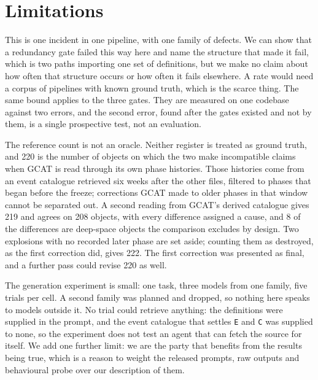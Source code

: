 \section{Limitations}
\label{sec:limits}

This is one incident in one pipeline, with one family of defects. We can show
that a redundancy gate failed this way here and name the structure that made it
fail, which is two paths importing one set of definitions, but we make no claim
about how often that structure occurs or how often it fails elsewhere. A rate
would need a corpus of pipelines with known ground truth, which is the scarce
thing. The same bound applies to the three gates. They are measured on one
codebase against two errors, and the second error, found after the gates existed and not by
them, is a single prospective test, not an evaluation.

The reference count is not an oracle. Neither register is treated as ground
truth, and 220 is the number of objects on which the two make incompatible
claims when GCAT is read through its own phase histories. Those histories come
from an event catalogue retrieved six weeks after the other files, filtered to
phases that began before the freeze; corrections GCAT made to older phases in
that window cannot be separated out. A second reading from GCAT's derived
catalogue gives 219 and agrees on 208 objects, with every difference assigned a
cause, and 8 of the differences are deep-space objects the comparison excludes
by design. Two explosions with no recorded later phase are set aside; counting
them as destroyed, as the first correction did, gives 222. The first correction
was presented as final, and a further pass could revise 220 as well.

The generation experiment is small: one task, three models from one family, five
trials per cell. A second family was planned and dropped, so nothing here speaks
to models outside it. No trial could retrieve anything: the definitions were
supplied in the prompt, and the event catalogue that settles \texttt{E} and
\texttt{C} was supplied to none, so the experiment does not test an agent that
can fetch the source for itself. We add one further limit: we are the party that benefits from the results being
true, which is a reason to weight the released prompts, raw outputs and
behavioural probe over our description of them.
